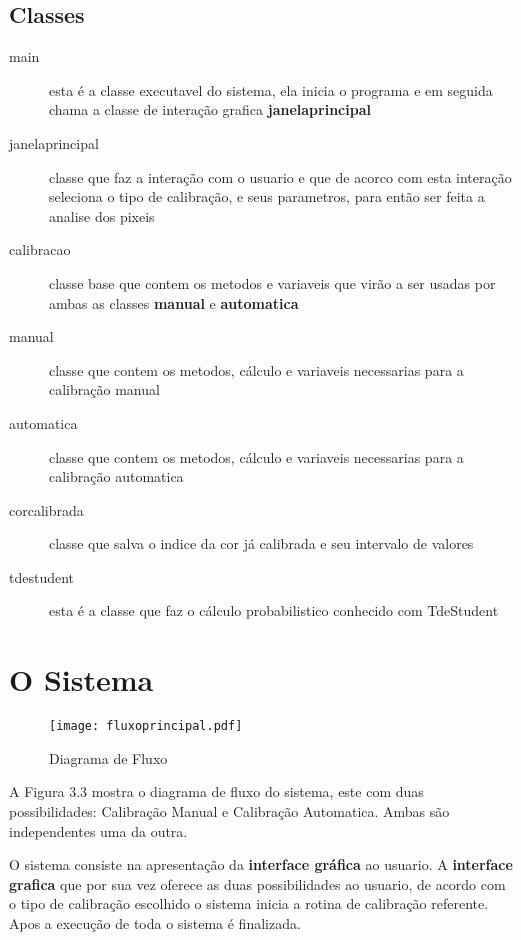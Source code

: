\subsection{Classes}
	\begin{description}

	\item [main] esta é a classe executavel do sistema, ela inicia o programa e em seguida chama a classe de interação grafica \textbf{janelaprincipal}  
	
	\item [janelaprincipal]	classe que faz a interação com o usuario e que de acorco com esta interação seleciona o tipo de calibração, e seus parametros, para então ser feita a analise dos pixeis	
		
	\item [calibracao] classe base que contem os metodos e variaveis que virão a ser usadas por ambas as classes \textbf{manual} e \textbf{automatica}
	
	\item [manual] classe que contem os metodos, cálculo e variaveis necessarias para a calibração manual
	
	\item [automatica] classe que contem os metodos, cálculo e variaveis necessarias para a calibração automatica
			
	\item [corcalibrada] classe que salva o indice da cor já calibrada e seu intervalo de valores
	
	\item [tdestudent] esta é a classe que faz o cálculo probabilistico conhecido com TdeStudent
	

	\end{description}

	

	\section{O Sistema}

		\begin{figure}[!h]
			\centering
			\texttt{[image: fluxoprincipal.pdf]}
			\caption{Diagrama de Fluxo}
			\label{FlowCHart}
		\end{figure}
		A Figura 3.3 mostra o diagrama de fluxo do sistema, este com duas possibilidades: Calibração Manual e Calibração Automatica. Ambas são independentes uma da outra.  
		
		 O sistema consiste na apresentação da \textbf{interface gráfica} ao usuario. A \textbf{interface grafica} que por sua vez oferece as duas possibilidades ao usuario, de acordo com o tipo de calibração escolhido o sistema inicia a rotina de calibração referente. Apos a execução de toda o sistema é finalizada.
			
